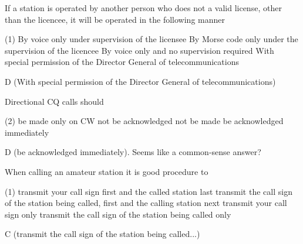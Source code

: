 \documentclass[a4paper]{article}
\begin{document}
\begin{question}If a station is operated by another person who does not a valid license, other than the licencee, it will be operated in the following manner
	\begin{tasks}(1)
		\task By voice only under supervision of the licensee
		\task By Morse code only under the supervision of the licencee
		\task By voice only and no supervision required
		\task With special permission of the Director General of telecommunications
	\end{tasks}
\end{question}

\begin{solution}
	D (With special permission of the Director General of telecommunications)
\end{solution}

\vspace{5mm}



\begin{question}Directional CQ calls should
	\begin{tasks}(2)
		\task be made only on CW
		\task not be acknowledged
		\task not be made
		\task be acknowledged immediately
	\end{tasks}
\end{question}

\begin{solution}
	D (be acknowledged immediately). Seems like a common-sense answer?
\end{solution}

\vspace{5mm}



\begin{question}When calling an amateur station it is good procedure to
	\begin{tasks}(1)
		\task transmit your call sign first and the called station last
		\task transmit the call sign of the station being called, first and the calling station next
		\task transmit your call sign only
		\task transmit the call sign of the station being called only
	\end{tasks}
\end{question}

\begin{solution}
	C (transmit the call sign of the station being called...)
\end{solution}

\vspace{5mm}
\end{document}
